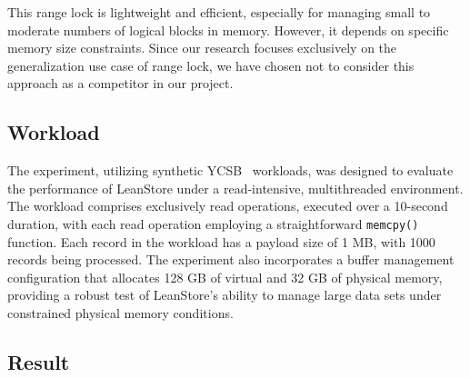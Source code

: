 This range lock is lightweight and efficient, especially for managing small to moderate numbers of logical blocks in memory.
However, it depends on specific memory size constraints. 
Since our research focuses exclusively on the generalization use case of range lock, we have chosen not to consider this approach as a competitor in our project.

\subsection{Workload}

The experiment, utilizing synthetic YCSB~\parencite{cooper2010benchmarking} workloads, was designed to evaluate the performance of LeanStore under a read-intensive, multithreaded environment. 
The workload comprises exclusively read operations, executed over a 10-second duration, with each read operation employing a straightforward \texttt{memcpy()} function. Each record in the workload has a payload size of 1 MB, with 1000 records being processed. 
The experiment also incorporates a buffer management configuration that allocates 128 GB of virtual and 32 GB of physical memory, providing a robust test of LeanStore's ability to manage large data sets under constrained physical memory conditions.

\subsection{Result}

